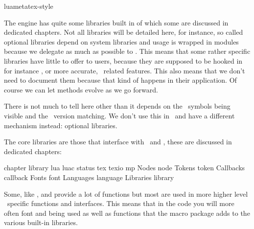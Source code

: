 
\environment luametatex-style

\startdocument[title=Libraries]

\startsubject[title=Contents]
    \setups[sectioncontents]
\stopsubject

\startsection[title={Introduction}]

The engine has quite some libraries built in of which some are discussed in
dedicated chapters. Not all libraries will be detailed here, for instance, so
called optional libraries depend on system libraries and usage is wrapped in
modules because we delegate as much as possible to \LUA. This means that some
rather specific libraries have little to offer to users, because they are
supposed to be hooked in for instance \METAPOST, or more accurate, \LUAMETAFUN\
related features. This also means that we don't need to document them because
that kind of happens in their application. Of course we can let methods evolve
as we go forward.

\stopsection

\startsection[title={Third party}]

There is not much to tell here other than it depends on the \LUA\ symbols being
visible and the \LUA\ version matching. We don't use this in \CONTEXT\ and have a
different mechanism instead: optional libraries.

\stopsection

\startsection[title={Core}]

The core libraries are those that interface with \TEX\ and \METAPOST, these are
discussed in dedicated chapters:

\starttabulate[|l|Tl|]
\FL
\BC chapter   \BC library          \NC \NR
\TL
\NC \LUA      \NC lua luac         \NC \NR
\NC \TEX      \NC status tex texio \NC \NR
\NC \METAPOST \NC mp               \NC \NR
\NC Nodes     \NC node             \NC \NR
\NC Tokens    \NC token            \NC \NR
\NC Callbacks \NC callback         \NC \NR
\NC Fonts     \NC font             \NC \NR
\NC Languages \NC language         \NC \NR
\NC Libraries \NC library          \NC \NR
\LL
\stoptabulate

Some, like ,  and  provide a lot of functions
but most are used in more higher level \CONTEXT\ specific functions and
interfaces. This means that in the code you will more often font 
and \type {tokens} being used as well as functions that the macro package adds to
the various built-in libraries.

